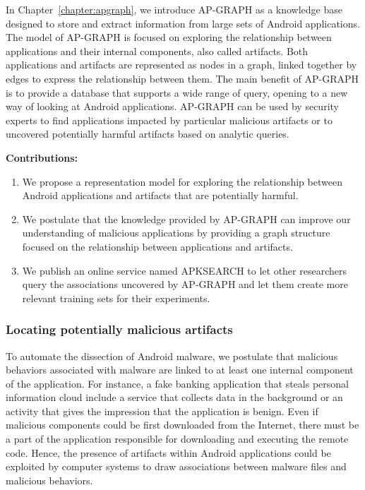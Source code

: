 In Chapter~\ref{chapter:apgraph}, we introduce AP-GRAPH as a knowledge base designed to store and extract information from large sets of Android applications.
The model of AP-GRAPH is focused on exploring the relationship between applications and their internal components, also called artifacts.
Both applications and artifacts are represented as nodes in a graph, linked together by edges to express the relationship between them.
The main benefit of AP-GRAPH is to provide a database that supports a wide range of query, opening to a new way of looking at Android applications.
AP-GRAPH can be used by security experts to find applications impacted by particular malicious artifacts or to uncovered potentially harmful artifacts based on analytic queries.

\begin{mdframed}[hidealllines=true,nobreak=true]
\textbf{Contributions:}

\begin{enumerate}
	\item We propose a representation model for exploring the relationship between Android applications and artifacts that are potentially harmful.
	\item We postulate that the knowledge provided by AP-GRAPH can improve our understanding of malicious applications by providing a graph structure focused on the relationship between applications and artifacts.
	\item We publish an online service named APKSEARCH to let other researchers query the associations uncovered by AP-GRAPH and let them create more relevant training sets for their experiments.
\end{enumerate}
\end{mdframed}

\subsubsection{Locating potentially malicious artifacts}
To automate the dissection of Android malware, we postulate that malicious behaviors associated with malware are linked to at least one internal component of the application.
For instance, a fake banking application that steals personal information cloud include a service that collects data in the background or an activity that gives the impression that the application is benign.
Even if malicious components could be first downloaded from the Internet, there must be a part of the application responsible for downloading and executing the remote code.
Hence, the presence of artifacts within Android applications could be exploited by computer systems to draw associations between malware files and malicious behaviors.

